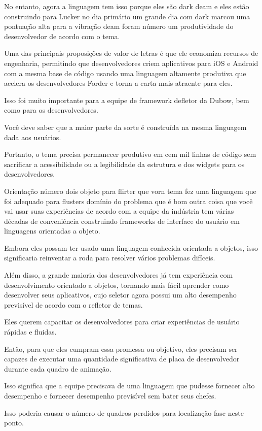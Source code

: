No entanto, agora a linguagem tem isso porque eles são dark deam e eles estão construindo para Lucker no dia primário um grande dia com dark marcou uma pontuação alta para a vibração deam foram número um produtividade do desenvolvedor de acordo com o tema.

Uma das principais proposições de valor de letras é que ele economiza recursos de engenharia, permitindo que desenvolvedores criem aplicativos para iOS e Android com a mesma base de código usando uma linguagem altamente produtiva que acelera os desenvolvedores Forder e torna a carta mais atraente para eles.

Isso foi muito importante para a equipe de framework defletor da Dubow, bem como para os desenvolvedores.

Você deve saber que a maior parte da sorte é construída na mesma linguagem dada aos usuários.

Portanto, o tema precisa permanecer produtivo em cem mil linhas de código sem sacrificar a acessibilidade ou a legibilidade da estrutura e dos widgets para os desenvolvedores.

Orientação número dois objeto para flirter que vorn tema fez uma linguagem que foi adequado para flusters domínio do problema que é bom outra coisa que você vai usar suas experiências de acordo com a equipe da indústria tem várias décadas de conveniência construindo frameworks de interface do usuário em linguagens orientadas a objeto.

Embora eles possam ter usado uma linguagem conhecida orientada a objetos, isso significaria reinventar a roda para resolver vários problemas difíceis.

Além disso, a grande maioria dos desenvolvedores já tem experiência com desenvolvimento orientado a objetos, tornando mais fácil aprender como desenvolver seus aplicativos, cujo seletor agora possui um alto desempenho previsível de acordo com o refletor de temas.

Eles querem capacitar os desenvolvedores para criar experiências de usuário rápidas e fluidas.

Então, para que eles cumpram essa promessa ou objetivo, eles precisam ser capazes de executar uma quantidade significativa de placa de desenvolvedor durante cada quadro de animação.

Isso significa que a equipe precisava de uma linguagem que pudesse fornecer alto desempenho e fornecer desempenho previsível sem bater seus chefes.

Isso poderia causar o número de quadros perdidos para localização fasc neste ponto.

